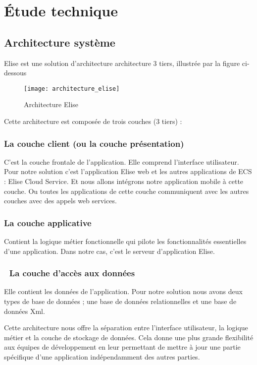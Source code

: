 \section{Étude technique}
\subsection{Architecture système}
Elise est une solution d'architecture architecture 3 tiers, illustrée par la figure ci-dessous 
\begin{figure}[H]
  \centering
  \texttt{[image: architecture\_elise]}
  \caption{Architecture Elise}
  \label{fig:architecture_elise}
\end{figure}
Cette architecture est composée de trois couches (3 tiers) :

\subsubsection{La couche client (ou la couche présentation)}
C'est la couche frontale de l'application. Elle comprend l'interface utilisateur. Pour notre solution c'est l'application Elise web et les autres applications de ECS : Elise Cloud Service. Et nous allons intégrons notre application mobile à cette couche. Ou toutes les applications de cette couche communiquent avec les autres couches avec des appels web services.

\subsubsection{La couche applicative}
Contient la logique métier fonctionnelle qui pilote les fonctionnalités essentielles d'une application. Dans notre cas, c'est le serveur d'application Elise.

\subsubsection{	La couche d'accès aux données}
Elle contient les données de l'application. Pour notre solution nous avons deux types de base de données ; une base de données relationnelles et une base de données Xml.

Cette architecture nous offre la séparation entre l'interface utilisateur, la logique métier et la couche de stockage de données. Cela donne une plus grande flexibilité aux équipes de développement en leur permettant de mettre à jour une partie spécifique d'une application indépendamment des autres parties.

